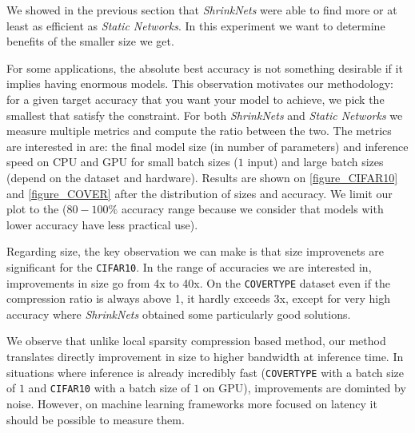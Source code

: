 We showed in the previous section that \textit{ShrinkNets} were able to find
more or at least as efficient as \textit{Static Networks}. In this experiment we
want to determine benefits of the smaller size we get.

For some applications, the absolute best accuracy is not something desirable if
it implies having enormous models. This observation motivates our methodology:
for a given target accuracy that you want your model to achieve, we pick the
smallest that satisfy the constraint. For both \textit{ShrinkNets} and
\textit{Static Networks} we measure multiple metrics and compute the ratio
between the two. The metrics are interested in are: the final model size (in
number of parameters) and inference speed on CPU and GPU for small batch sizes
($1$ input) and large batch sizes (depend on the dataset and hardware). Results
are shown on \cref{figure_CIFAR10} and \cref{figure_COVER} after the
distribution of sizes and accuracy. We limit our plot to the ($80-100\%$
accuracy range because we consider that models with lower accuracy have less
practical use).

Regarding size, the key observation we can make is that size improvenets are
significant for the \texttt{CIFAR10}. In the range of accuracies we are
interested in, improvements in size go from 4x to 40x. On the \texttt{COVERTYPE}
dataset even if the compression ratio is always above 1, it hardly exceeds 3x,
except for very high accuracy where \textit{ShrinkNets} obtained some
particularly good solutions.

We observe that unlike local sparsity compression based method, our method
translates directly improvement in size to higher bandwidth at inference time.
In situations where inference is already incredibly fast (\texttt{COVERTYPE}
with a batch size of $1$ and \texttt{CIFAR10} with a batch size of $1$ on GPU),
improvements are dominted by noise. However, on machine learning frameworks
more focused on latency it should be possible to measure them.


